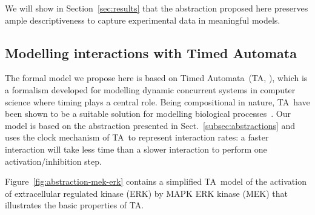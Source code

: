 We will show in Section~\ref{sec:results} that the abstraction proposed here preserves ample
descriptiveness to capture experimental data in meaningful models.


\subsection{Modelling interactions with Timed Automata}\label{subsec:timed-automata}
\def\ta{TA}
\def\tas{TA}

The formal model we propose here is based on Timed Automata~(\tas, \citealt{timed-automata-alur-dill}), which is a
formalism developed for modelling dynamic concurrent systems in computer science where timing plays a central role.
Being compositional in nature, \tas\ have been shown to be a suitable solution for
modelling biological processes~\citep{ta-siebert,bartocci-oscillators,oded-ode-ta-discretization}.
Our model is based on the abstraction presented in Sect.~\ref{subsec:abstractions}
and uses the clock mechanism of \tas\ to represent interaction rates:
a faster interaction will take less time than a slower interaction to perform one activation/inhibition step.

Figure~\ref{fig:abstraction-mek-erk} contains a simplified \tas\ model of the activation of extracellular
regulated kinase (ERK) by MAPK ERK kinase (MEK) that illustrates the basic properties of \tas.



